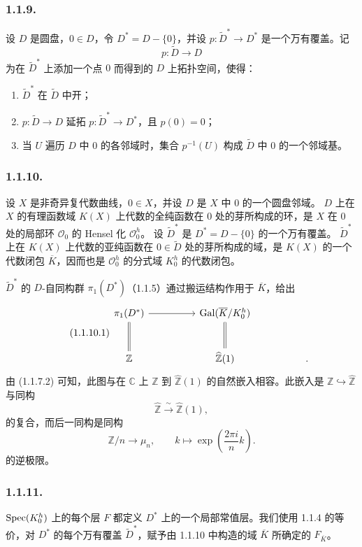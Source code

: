 \subsubsection*{1.1.9.}
设 $D$ 是圆盘，$0\in D$，令 $D^*=D-\{0\}$，并设 $p:\widetilde D^*\longrightarrow D^*$ 是一个万有覆盖。记
\[
p:\widetilde D\longrightarrow D
\]
为在 $\widetilde D^*$ 上添加一个点 $0$ 而得到的 $D$ 上拓扑空间，使得：
\begin{enumerate}[label=(\alph*),leftmargin=2.6em]
\item $\widetilde D^*$ 在 $\widetilde D$ 中开；
\item $p:\widetilde D\longrightarrow D$ 延拓 $p:\widetilde D^*\longrightarrow D^*$，且 $p(0)=0$；
\item 当 $U$ 遍历 $D$ 中 $0$ 的各邻域时，集合 $p^{-1}(U)$ 构成 $\widetilde D$ 中 $0$ 的一个邻域基。
\end{enumerate}

\subsubsection*{1.1.10.}
设 $X$ 是非奇异复代数曲线，$0\in X$，并设 $D$ 是 $X$ 中 $0$ 的一个圆盘邻域。
$D$ 上在 $X$ 的有理函数域 $K(X)$ 上代数的全纯函数在 $0$ 处的芽所构成的环，是 $X$ 在 $0$ 处的局部环 $\mathcal O_0$ 的 Hensel 化 $\mathcal O_0^h$。
设 $\widetilde D^*$ 是 $D^*=D-\{0\}$ 的一个万有覆盖。
$\widetilde D^*$ 上在 $K(X)$ 上代数的亚纯函数在 $0\in\widetilde D$ 处的芽所构成的域，是 $K(X)$ 的一个代数闭包 $\overline K$，因而也是 $\mathcal O_0^h$ 的分式域 $K_0^h$ 的代数闭包。

$\widetilde D^*$ 的 $D$-自同构群 $\pi_1(D^*)$（1.1.5）通过搬运结构作用于 $\overline K$，给出
\begin{equation}\tag{1.1.10.1}
\begin{tikzcd}[column sep=huge, row sep=large]
\pi_1(D^*) \arrow[r] \arrow[d, equal]
  & \operatorname{Gal}(\overline K/K_0^h) \arrow[d, equal]
  & {} \\
\mathbb Z
  & \widehat{\mathbb Z}(1)
  & .
\end{tikzcd}
\end{equation}
由 (1.1.7.2) 可知，此图与在 $\mathbb C$ 上 $\mathbb Z$ 到 $\widehat{\mathbb Z}(1)$ 的自然嵌入相容。此嵌入是 $\mathbb Z\hookrightarrow\widehat{\mathbb Z}$ 与同构
\[
\widehat{\mathbb Z}\xrightarrow{\ \sim\ }
\widehat{\mathbb Z}(1),
\]
的复合，而后一同构是同构
\[
\mathbb Z/n\longrightarrow\mu_n,
\qquad
k\longmapsto\exp\left(\frac{2\pi i}{n}k\right).
\]
的逆极限。

\subsubsection*{1.1.11.}
$\operatorname{Spec}(K_0^h)$ 上的每个层 $F$ 都定义 $D^*$ 上的一个局部常值层。我们使用 1.1.4 的等价，对 $D^*$ 的每个万有覆盖 $\widetilde D^*$，赋予由 1.1.10 中构造的域 $\overline K$ 所确定的 $F_{\overline K}$。
